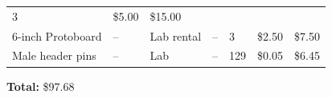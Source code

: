 \documentclass[]{article}
\begin{document}
\begin{appendices}
\begin{centering}
\begin{longtable}[]{@{}lllllll@{}}
\begin{minipage}[t]{0.11\columnwidth}
  3\strut
  \end{minipage} & \begin{minipage}[t]{0.06\columnwidth}\raggedright
  \$5.00\strut
  \end{minipage} & \begin{minipage}[t]{0.07\columnwidth}\raggedright
  \$15.00\strut
  \end{minipage}\tabularnewline
  \begin{minipage}[t]{0.15\columnwidth}\raggedright
  6-inch Protoboard\strut
  \end{minipage} & \begin{minipage}[t]{0.15\columnwidth}\raggedright
  --\strut
  \end{minipage} & \begin{minipage}[t]{0.10\columnwidth}\raggedright
  Lab rental\strut
  \end{minipage} & \begin{minipage}[t]{0.17\columnwidth}\raggedright
  --\strut
  \end{minipage} & \begin{minipage}[t]{0.11\columnwidth}\raggedright
  3\strut
  \end{minipage} & \begin{minipage}[t]{0.06\columnwidth}\raggedright
  \$2.50\strut
  \end{minipage} & \begin{minipage}[t]{0.07\columnwidth}\raggedright
  \$7.50\strut
  \end{minipage}\tabularnewline
  \begin{minipage}[t]{0.15\columnwidth}\raggedright
  Male header pins\strut
  \end{minipage} & \begin{minipage}[t]{0.15\columnwidth}\raggedright
  --\strut
  \end{minipage} & \begin{minipage}[t]{0.10\columnwidth}\raggedright
  Lab\strut
  \end{minipage} & \begin{minipage}[t]{0.17\columnwidth}\raggedright
  --\strut
  \end{minipage} & \begin{minipage}[t]{0.11\columnwidth}\raggedright
  129\strut
  \end{minipage} & \begin{minipage}[t]{0.06\columnwidth}\raggedright
  \$0.05\strut
  \end{minipage} & \begin{minipage}[t]{0.07\columnwidth}\raggedright
  \$6.45\strut
  \end{minipage}\tabularnewline
  \bottomrule
  \end{longtable}
  \end{centering}

  \textbf{Total:} \$97.68
\end{appendices}
\end{document}
